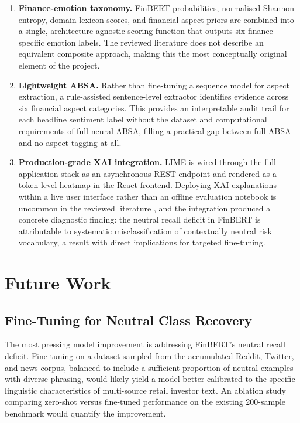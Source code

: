 \begin{enumerate}
    \item \textbf{Finance-emotion taxonomy.} FinBERT probabilities, normalised Shannon entropy, domain lexicon scores, and financial aspect priors are combined into a single, architecture-agnostic scoring function that outputs six finance-specific emotion labels. The reviewed literature does not describe an equivalent composite approach, making this the most conceptually original element of the project.

    \item \textbf{Lightweight ABSA.} Rather than fine-tuning a sequence model for aspect extraction, a rule-assisted sentence-level extractor identifies evidence across six financial aspect categories. This provides an interpretable audit trail for each headline sentiment label without the dataset and computational requirements of full neural ABSA, filling a practical gap between full ABSA and no aspect tagging at all.

    \item \textbf{Production-grade XAI integration.} LIME is wired through the full application stack as an asynchronous REST endpoint and rendered as a token-level heatmap in the React frontend. Deploying XAI explanations within a live user interface rather than an offline evaluation notebook is uncommon in the reviewed literature \citep{yeo2023xai}, and the integration produced a concrete diagnostic finding: the neutral recall deficit in FinBERT is attributable to systematic misclassification of contextually neutral risk vocabulary, a result with direct implications for targeted fine-tuning.
\end{enumerate}

\section{Future Work}
\label{sec:future_work}

\subsection{Fine-Tuning for Neutral Class Recovery}

The most pressing model improvement is addressing FinBERT's neutral recall deficit.  Fine-tuning on a dataset sampled from the accumulated Reddit, Twitter, and news corpus, balanced to include a sufficient proportion of neutral examples with diverse phrasing, would likely yield a model better calibrated to the specific linguistic characteristics of multi-source retail investor text.  An ablation study comparing zero-shot versus fine-tuned performance on the existing 200-sample benchmark would quantify the improvement.

